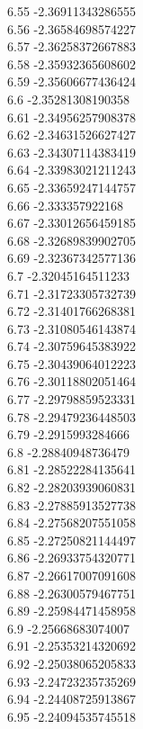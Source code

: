 {6.55	-2.36911343286555\\
6.56	-2.36584698574227\\
6.57	-2.36258372667883\\
6.58	-2.35932365608602\\
6.59	-2.35606677436424\\
6.6	-2.35281308190358\\
6.61	-2.34956257908378\\
6.62	-2.34631526627427\\
6.63	-2.34307114383419\\
6.64	-2.33983021211243\\
6.65	-2.33659247144757\\
6.66	-2.333357922168\\
6.67	-2.33012656459185\\
6.68	-2.32689839902705\\
6.69	-2.32367342577136\\
6.7	-2.32045164511233\\
6.71	-2.31723305732739\\
6.72	-2.31401766268381\\
6.73	-2.31080546143874\\
6.74	-2.30759645383922\\
6.75	-2.30439064012223\\
6.76	-2.30118802051464\\
6.77	-2.29798859523331\\
6.78	-2.29479236448503\\
6.79	-2.2915993284666\\
6.8	-2.28840948736479\\
6.81	-2.28522284135641\\
6.82	-2.28203939060831\\
6.83	-2.27885913527738\\
6.84	-2.27568207551058\\
6.85	-2.27250821144497\\
6.86	-2.26933754320771\\
6.87	-2.26617007091608\\
6.88	-2.26300579467751\\
6.89	-2.25984471458958\\
6.9	-2.25668683074007\\
6.91	-2.25353214320692\\
6.92	-2.25038065205833\\
6.93	-2.24723235735269\\
6.94	-2.24408725913867\\
6.95	-2.24094535745518\\
}
